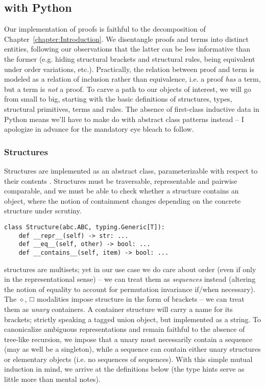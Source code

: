 \subsection{\NLPplus{} with Python}
Our implementation of \NLPplus{} proofs is faithful to the decomposition of Chapter~\ref{chapter:Introduction}.
We disentangle proofs and terms into distinct entities, following our observations that the latter can be less informative than the former (e.g. hiding structural brackets and structural rules, being equivalent under order variations, etc.).
Practically, the relation between proof and term is modeled as a relation of inclusion rather than equivalence, i.e. a proof \textit{has} a term, but a term is \textit{not} a proof.
To carve a path to our objects of interest, we will go from small to big, starting with the basic definitions of structures, types, structural primitives, terms and rules.
The absence of first-class inductive data in Python means we'll have to make do with abstract class patterns instead -- I apologize in advance for the mandatory eye bleach to follow.

\subsubsection{Structures}
Structures are implemented as an abstract class, parameterizable with respect to their contents .
Structures must be traversable, representable and pairwise comparable, and we must be able to check whether a structure contains an object, where the notion of containment changes depending on the concrete structure under scrutiny.

\begin{verbatim}
class Structure(abc.ABC, typing.Generic[T]):
	def __repr__(self) -> str: ...
	def __eq__(self, other) -> bool: ...
	def __contains__(self, item) -> bool: ...
\end{verbatim}

\noindent\NLP{} structures are multisets; yet in our use case we do care about order (even if only in the representational sense) -- we can treat them as \textit{sequences} instead (altering the notion of equality to account for permutation invariance if/when necessary).
The $\diamond$, $\bx$ modalities impose structure in the form of brackets -- we can treat them as \textit{unary} containers.
A container structure will carry a name for its brackets; strictly speaking a tagged union object, but implemented as a string.
To canonicalize ambiguous representations and remain faithful to the absence of tree-like recursion, we impose that a unary must necessarily contain a sequence (may as well be a singleton), while a sequence can contain either unary structures or elementary objects (i.e. no sequences of sequences).
With this simple mutual induction in mind, we arrive at the definitions below (the type hints serve as little more than mental notes).

